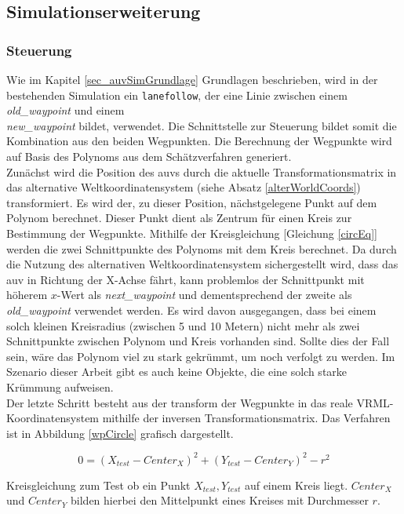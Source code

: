 \subsection{Simulationserweiterung}
\subsubsection{Steuerung}
\label{sec_waypoint}
Wie im Kapitel \ref{sec_auvSimGrundlage} Grundlagen beschrieben, wird in der bestehenden Simulation ein \texttt{\gls{lanefollow}}, der eine Linie zwischen einem \textit{old\_waypoint} und einem\\\textit{new\_waypoint} bildet, verwendet.
Die Schnittstelle zur Steuerung bildet somit die Kombination aus den beiden Wegpunkten. Die Berechnung der Wegpunkte wird auf Basis des Polynoms aus dem Schätzverfahren generiert.\\
Zunächst wird die Position des \gls{auv}s durch die aktuelle Transformationsmatrix in das alternative Weltkoordinatensystem (siehe Absatz \ref{alterWorldCoords}) transformiert. Es wird der, zu dieser Position, nächstgelegene Punkt auf dem Polynom berechnet. Dieser Punkt dient als Zentrum für einen Kreis zur Bestimmung der Wegpunkte. Mithilfe der Kreisgleichung [Gleichung \ref{circEq}] werden die zwei Schnittpunkte des Polynoms mit dem Kreis berechnet. Da durch die Nutzung des alternativen Weltkoordinatensystem sichergestellt wird, dass das \gls{auv} in Richtung der X-Achse fährt, kann problemlos der Schnittpunkt mit höherem $x$-Wert als \textit{next\_waypoint} und dementsprechend der zweite als \textit{old\_waypoint} verwendet werden. Es wird davon ausgegangen, dass bei einem solch kleinen Kreisradius (zwischen 5 und 10 Metern) nicht mehr als zwei Schnittpunkte zwischen Polynom und Kreis vorhanden sind. Sollte dies der Fall sein, wäre das Polynom viel zu stark gekrümmt, um noch verfolgt zu werden. Im Szenario dieser Arbeit gibt es auch keine Objekte, die eine solch starke Krümmung aufweisen.\\
Der letzte Schritt besteht aus der \gls{transform} der Wegpunkte in das reale VRML-Koordinatensystem mithilfe der inversen Transformationsmatrix.
Das Verfahren ist in Abbildung \ref{wpCircle} grafisch dargestellt.

\begin{ownequation}[H]
\begin{equation}
0 = (X_{test}-Center_X)^2+(Y_{test}-Center_Y)^2 - r^2
\end{equation}
\caption[Kreisgleichung zum Test, ob ein Punkt auf einem Kreis liegt.]{Kreisgleichung zum Test ob ein Punkt $X_{test},Y_{test}$ auf einem Kreis liegt. $Center_X$ und $Center_Y$ bilden hierbei den Mittelpunkt eines Kreises mit Durchmesser $r$.}
\label{circEq}
\end{ownequation}

